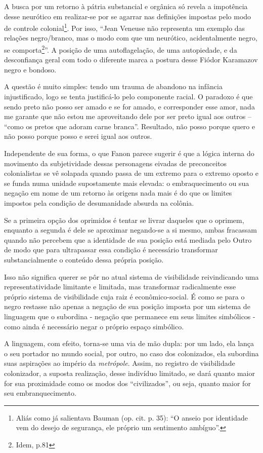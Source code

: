 A busca por um retorno à pátria substancial e orgânica só revela a
impotência desse neurótico em realizar-se por se agarrar nas definições
impostas pelo modo de controle colonial\footnote{Aliás como já
  salientava Bauman (op. cit. p. 35): ``O anseio por identidade vem do
  desejo de segurança, ele próprio um sentimento ambíguo''.}. Por isso,
``Jean Veneuse não representa um exemplo das relações negro/branco, mas
o modo com que um neurótico, acidentalmente negro, se comporta\footnote{Idem,
  p.81}''. A posição de uma autoflagelação, de uma autopiedade, e da
desconfiança geral com todo o diferente marca a postura desse Fiódor
Karamazov negro e bondoso.

A questão é muito simples: tendo um trauma de abandono na infância
injustificado, logo se tenta justificá-lo pelo componente racial. O
paradoxo é que sendo preto não posso ser amado e se for amado, e
corresponder esse amor, nada me garante que não estou me aproveitando
dele por ser preto igual aos outros -- ``como os pretos que adoram carne
branca''. Resultado, não posso porque quero e não posso porque posso e
serei igual aos outros.

Independente de sua forma, o que Fanon parece sugerir é que a lógica
interna do movimento da subjetividade dessas personagens eivadas de
preconceitos colonialistas se vê solapada quando passa de um extremo
para o extremo oposto e se funda numa unidade supostamente mais elevada:
o embraquecimento ou sua negação em nome de um retorno às origens nada
mais é do que os limites impostos pela condição de desumanidade absurda
na colônia.

Se a primeira opção dos oprimidos é tentar se livrar daqueles que o
oprimem, enquanto a segunda é dele se aproximar negando-se a si mesmo,
ambas fracassam quando não percebem que a identidade de sua posição está
mediada pelo Outro de modo que para ultrapassar essa condição é
necessário transformar substancialmente o conteúdo dessa própria
posição.

Isso não significa querer se pôr no atual sistema de visibilidade
reivindicando uma representatividade limitante e limitada, mas
transformar radicalmente esse próprio sistema de visibilidade cuja raiz
é econômico-social. É como se para o negro restasse não apenas a negação
de sua posição imposta por um sistema de linguagem que o subordina -
negação que permanece em seus limites simbólicos - como ainda é
necessário negar o próprio espaço simbólico.

A linguagem, com efeito, torna-se uma via de mão dupla: por um lado, ela
lança o seu portador no mundo social, por outro, no caso dos
colonizados, ela subordina suas aspirações ao império da
\emph{metrópole}. Assim, no registro de visibilidade colonizador, a
suposta realização, desse indivíduo limitado, se dará quanto maior for
sua proximidade como os modos dos ``civilizados'', ou seja, quanto maior
for seu embranquecimento.

